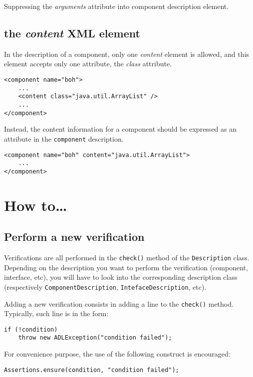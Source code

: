 \documentclass{article}
\newcommand{\code}[1]{\texttt{#1}}
\newcommand{\xml}[1]{\textsl{#1}}
\begin{document}
Suppressing the \xml{arguments} attribute into component description element.

\subsection{the \xml{content} XML element}

In the description of a component, only one \xml{content} element is allowed, and this element accepts
only one attribute, the \xml{class} attribute. 

\begin{lstlisting}
<component name="boh">
	...
	<content class="java.util.ArrayList" />
	...
</component>
\end{lstlisting}


Instead, the content information for a component should be expressed as
an attribute in the \texttt{component} description.

\begin{lstlisting}
<component name="boh" content="java.util.ArrayList">
	...
</component>
\end{lstlisting}

\section{How to\ldots}

\subsection{Perform a new verification}

Verifications are all performed in the \code{check()} method of the \code{Description}
class. Depending on the description you want to perform the verification (component, interface, etc),
you will have to look into the corresponding description class (respectively \code{ComponentDescription},
\code{IntefaceDescription}, etc).

Adding a new verification consists in adding a line to the \code{check()} method. Typically, such line
is in the form:

\begin{lstlisting}
if (!condition)
	throw new ADLException("condition failed");
\end{lstlisting}

For convenience purpose, the use of the following construct is encouraged:

\begin{lstlisting}
Assertions.ensure(condition, "condition failed");
\end{lstlisting}
\end{document}
